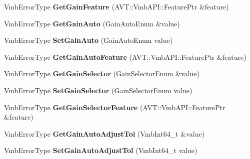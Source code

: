 \begin{DoxyCompactItemize}
\item 
\hypertarget{classMakoCamera_a38887bc546e460f2b459171fe3609dd2}{Vmb\-Error\-Type {\bfseries Get\-Gain\-Feature} (A\-V\-T\-::\-Vmb\-A\-P\-I\-::\-Feature\-Ptr \&feature)}\label{classMakoCamera_a38887bc546e460f2b459171fe3609dd2}

\item 
\hypertarget{classMakoCamera_aee1d2b064dc8b841e61f2cf0f250aa1b}{Vmb\-Error\-Type {\bfseries Get\-Gain\-Auto} (Gain\-Auto\-Enum \&value)}\label{classMakoCamera_aee1d2b064dc8b841e61f2cf0f250aa1b}

\item 
\hypertarget{classMakoCamera_a0b2246120ec7715c41e887bcee1c69e4}{Vmb\-Error\-Type {\bfseries Set\-Gain\-Auto} (Gain\-Auto\-Enum value)}\label{classMakoCamera_a0b2246120ec7715c41e887bcee1c69e4}

\item 
\hypertarget{classMakoCamera_a313e3e3c500fcef17c7041b1923eb98d}{Vmb\-Error\-Type {\bfseries Get\-Gain\-Auto\-Feature} (A\-V\-T\-::\-Vmb\-A\-P\-I\-::\-Feature\-Ptr \&feature)}\label{classMakoCamera_a313e3e3c500fcef17c7041b1923eb98d}

\item 
\hypertarget{classMakoCamera_a854679fd1393371872095d649f308dec}{Vmb\-Error\-Type {\bfseries Get\-Gain\-Selector} (Gain\-Selector\-Enum \&value)}\label{classMakoCamera_a854679fd1393371872095d649f308dec}

\item 
\hypertarget{classMakoCamera_ac5caaa8c8730bed58e269bb94728fd36}{Vmb\-Error\-Type {\bfseries Set\-Gain\-Selector} (Gain\-Selector\-Enum value)}\label{classMakoCamera_ac5caaa8c8730bed58e269bb94728fd36}

\item 
\hypertarget{classMakoCamera_abddbcee0ea435e390134b8bf60d52931}{Vmb\-Error\-Type {\bfseries Get\-Gain\-Selector\-Feature} (A\-V\-T\-::\-Vmb\-A\-P\-I\-::\-Feature\-Ptr \&feature)}\label{classMakoCamera_abddbcee0ea435e390134b8bf60d52931}

\item 
\hypertarget{classMakoCamera_a96b1882f2993ec5a1a130336ce376d9d}{Vmb\-Error\-Type {\bfseries Get\-Gain\-Auto\-Adjust\-Tol} (Vmb\-Int64\-\_\-t \&value)}\label{classMakoCamera_a96b1882f2993ec5a1a130336ce376d9d}

\item 
\hypertarget{classMakoCamera_a3300008b8d363ce3660bf54dee4b9377}{Vmb\-Error\-Type {\bfseries Set\-Gain\-Auto\-Adjust\-Tol} (Vmb\-Int64\-\_\-t value)}\label{classMakoCamera_a3300008b8d363ce3660bf54dee4b9377}


\end{DoxyCompactItemize}
